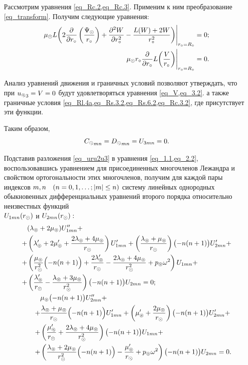 Рассмотрим уравнения \cref{eq_Rc.2,eq_Rc.3}. Применим к ним преобразование \cref{eq_transform}. Получим следующие уравнения:
\begin{align}
\mu_\odot L\!\left(2\frac{\partial}{\partial r_\circ}\left(\frac{\Psi_\odot}{r_\circ}\right) + \frac{\partial^2 W}{\partial r_\circ^2} - \frac{L(W) + 2W}{r_\circ^2}\right)&\Biggr|_{r_\circ=R_\circ}=0;\label{eq_Rc.2.2}\\
\mu_\odot r_\circ\frac{\partial}{\partial r_\circ}L\!\left(\frac{V}{r_\circ}\right)&\Biggr|_{r_\circ=R_\circ} = 0.\label{eq_Rc.3.2}
\end{align}

Анализ уравнений движения и граничных условий позволяют утверждать, что при ${u_\circledcirc}_3 = V = 0$ будут удовлетворяться уравнения \cref{eq_V,eq_3.2}. а также граничные условия \cref{eq_Rl.4a,eq_Rs.3.2,eq_Rs.6.2,eq_Rc.3.2}, где присутствует эти функции.

Таким образом,
$$
{C_\odot}_{mn} = {D_\odot}_{mn} = U_{3mn} = 0.
$$

Подставив разложения \cref{eq_uru2u3} в уравнения \cref{eq_1.1,eq_2.2}, воспользовавшись уравнением для присоединенных многочленов Лежандра и свойством ортогональности этих многочленов, получим для каждой пары индексов $m,n \quad(n = 0,1,\ldots; \lvert m\rvert\leq n)$ систему линейных однородных обыкновенных дифференциальных уравнений второго порядка относительно неизвестных функций \\ $U_{1mn}(r_\odot)$ и $ U_{2mn}(r_\odot):$
\begin{align}
\begin{split}
&(\lambda_\circledcirc + 2\mu_\circledcirc)U''_{1mn} + \\
+ &\left(\lambda'_\circledcirc+2\mu'_\circledcirc + \frac{2\lambda_\circledcirc+4\mu_\circledcirc}{r_\odot}\right)U'_{1mn} + \left(\frac{\lambda_\circledcirc+\mu_\circledcirc}{r_\odot}\right)\bigl(-n(n+1)\bigr)U'_{2mn} + \\
+ &\left(\frac{\mu_\circledcirc}{r_\odot^2}\Bigl(-n(n+1)\Bigr) + \frac{2\lambda'_\circledcirc}{r_\odot} - \frac{2\lambda_\circledcirc + 4\mu_\circledcirc}{r_\odot^2} + p_\circledcirc\omega^2\right)U_{1mn} + \\
+ &\left(\frac{\lambda'_\circledcirc}{r_\odot} - \frac{\lambda_\circledcirc+3\mu_\circledcirc}{r_\odot^2}\right)\bigl(-n(n+1)\bigr)U_{2mn} = 0;
\end{split}\label{eq_final_1}\\
\begin{split}
&\mu_\circledcirc\bigl(-n(n+1)\bigr)U''_{2mn} +\\
+ &\frac{\lambda_\circledcirc+\mu_\circledcirc}{r_\odot}\Bigl(-n(n+1)\Bigr)U'_{1mn} + \left(\mu'_\circledcirc+\frac{2\mu_\circledcirc}{r_\odot}\right)\bigl(-n(n+1)\bigr)U'_{2mn} + \\
+ &\left(\frac{\mu'_\circledcirc}{r_\odot} + \frac{2\lambda_\circledcirc+4\mu_\circledcirc}{r_\odot^2}\right)\bigl(-n(n+1)\bigr)U_{1mn} + \\
+ &\left(\frac{\lambda_\circledcirc+2\mu_\circledcirc}{r_\odot^2}\Bigl(-n(n+1)\Bigr) - \frac{\mu'_\circledcirc}{r_\odot} + p_\circledcirc\omega^2\right)\bigl(-n(n+1)\bigr)U_{2mn} = 0.
\end{split}\label{eq_final_2}
\end{align}

